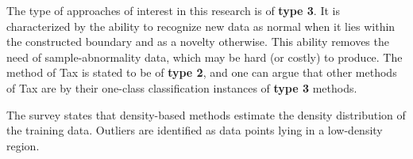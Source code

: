 The type of approaches of interest in this research is of \textbf{type 3}.
It is characterized by the ability to recognize new data as normal when it lies within the constructed boundary and as a novelty otherwise.
This ability removes the need of sample-abnormality data, which may be hard (or costly) to produce.
The method of Tax \etal \cite{tax1999supportdata} is stated to be of \textbf{type 2}, and one can argue that other methods of Tax \etal \cite{tax2001one,tax2004support} are by their one-class classification instances of \textbf{type 3} methods.

The survey states that density-based methods estimate the density distribution of the training data.
Outliers are identified as data points lying in a low-density region.